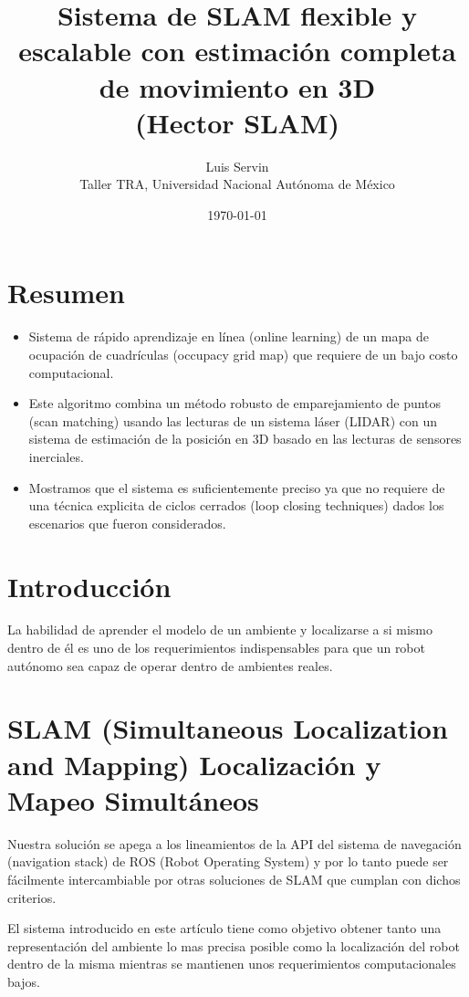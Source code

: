 \documentclass[10pt,a4paper]{article}
\title{Sistema de SLAM flexible y escalable con estimación completa de movimiento en 3D \\  \large{(Hector SLAM)}}
\date{\today}
\author{Luis Servin\\ Taller TRA, Universidad Nacional Autónoma de México}
\begin{document}
\maketitle

\section{Resumen}

\begin{itemize}

\item Sistema de rápido aprendizaje en línea (online learning) de un mapa de ocupación de cuadrículas (occupacy grid map) que requiere de un bajo costo computacional.
\item Este algoritmo combina un método robusto de emparejamiento de puntos (scan matching) usando las lecturas de un sistema láser (LIDAR) con un sistema de estimación de la posición en 3D basado en las lecturas de sensores inerciales.
\item Mostramos que el sistema es suficientemente preciso ya que no requiere de una técnica explicita de ciclos cerrados (loop closing techniques) dados los escenarios que fueron considerados.
	
\end{itemize}

\section{Introducción}

La habilidad de aprender el modelo de un ambiente y localizarse a si mismo dentro de él es uno de los requerimientos indispensables para que un robot autónomo sea capaz de operar dentro de ambientes reales.

\section{SLAM (Simultaneous Localization and Mapping) Localización y Mapeo Simultáneos}

Nuestra solución se apega a los lineamientos de la API del sistema de navegación (navigation stack) de ROS (Robot Operating System) y por lo tanto puede ser fácilmente intercambiable por otras soluciones de SLAM que cumplan con dichos criterios.

El sistema introducido en este artículo tiene como objetivo obtener tanto una representación del ambiente lo mas precisa posible como la localización del robot dentro de la misma mientras se mantienen unos requerimientos computacionales bajos.
\end{document}
